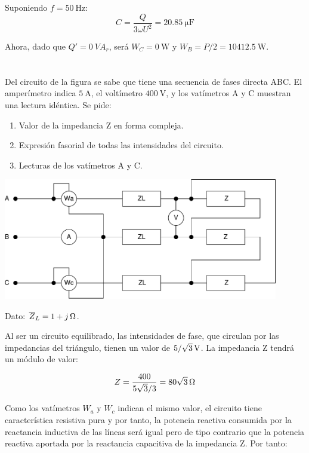 \documentclass[12pt]{article}
\begin{document}
Suponiendo $f = \SI{50}{\hertz}$:
\[
  C = \frac{Q}{3 \omega U^2} = \SI{20.85}{\micro\farad}
\]

Ahora, dado que $Q' = \SI{0}{VA}_r$, será $W_C = \SI{0}{\watt}$ y
$W_B = P/2 = \SI{10412.5}{\watt}$.

\clearpage

\section{}

Del circuito de la figura se sabe que tiene una secuencia de fases
directa ABC. El amperímetro indica $\SI{5}{\ampere}$, el voltímetro
$\SI{400}{\volt}$, y los vatímetros A y C muestran una lectura
idéntica. Se pide:

\begin{enumerate}
\item Valor de la impedancia Z en forma compleja.
\item Expresión fasorial de todas las intensidades del circuito.
\item Lecturas de los vatímetros A y C.
\end{enumerate}

\begin{center}
  \includegraphics[width = 0.9\textwidth]{../figs/trifasica}
\end{center}

Dato: $\overline{Z}_L = \SI[parse-numbers = false]{1 + j}{\ohm}$.

\noindent\hrulefill

Al ser un circuito equilibrado, las intensidades de fase, que
circulan por las impedancias del triángulo, tienen un valor de
$\SI[parse-numbers=false]{5/\sqrt{3}}{\volt}$. La impedancia Z
tendrá un módulo de valor:

\[
  Z = \frac{400}{5\sqrt{3}/3} =
  \SI[parse-numbers=false]{80\sqrt{3}}{\ohm}
\]

Como los vatímetros $W_a$ y $W_c$ indican el mismo valor, el
circuito tiene característica resistiva pura y por tanto, la
potencia reactiva consumida por la reactancia inductiva de las
líneas será igual pero de tipo contrario que la potencia reactiva
aportada por la reactancia capacitiva de la impedancia Z. Por tanto:
\end{document}
